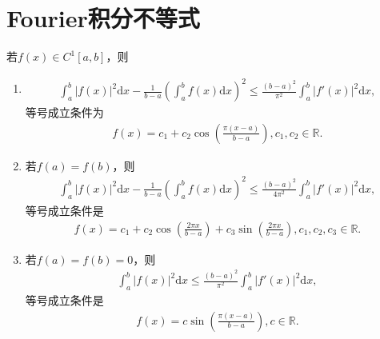 \documentclass[../../main.tex]{subfiles}
\begin{document}
\section{Fourier积分不等式}

\begin{theorem}[Fourier积分不等式]\label{theorem:Fourier积分不等式}
若$f(x)\in C^1[a,b]$，则
\begin{enumerate}[(1)]
\item \begin{align*}
\int_{a}^{b} |f(x)|^2 \mathrm{d}x - \frac{1}{b - a} \left( \int_{a}^{b} f(x) \mathrm{d}x \right)^2 \leq \frac{(b - a)^2}{\pi^2} \int_{a}^{b} |f'(x)|^2 \mathrm{d}x,
\end{align*}
等号成立条件为
\begin{align*}
f(x) = c_1 + c_2 \cos\left( \frac{\pi(x - a)}{b - a} \right), c_1, c_2 \in \mathbb{R}.
\end{align*}

\item 若$f(a) = f(b)$，则
\begin{align*}
\int_{a}^{b} |f(x)|^2 \mathrm{d}x - \frac{1}{b - a} \left( \int_{a}^{b} f(x) \mathrm{d}x \right)^2 \leq \frac{(b - a)^2}{4\pi^2} \int_{a}^{b} |f'(x)|^2 \mathrm{d}x,
\end{align*}
等号成立条件是
\begin{align*}
f(x) = c_1 + c_2 \cos\left( \frac{2\pi x}{b - a} \right) + c_3 \sin\left( \frac{2\pi x}{b - a} \right), c_1, c_2, c_3 \in \mathbb{R}.
\end{align*}

\item 若$f(a) = f(b) = 0$，则
\begin{align*}
\int_{a}^{b} |f(x)|^2 \mathrm{d}x \leq \frac{(b - a)^2}{\pi^2} \int_{a}^{b} |f'(x)|^2 \mathrm{d}x,
\end{align*}
等号成立条件是
\begin{align*}
f(x) = c \sin\left( \frac{\pi (x - a)}{b - a} \right), c \in \mathbb{R}.
\end{align*} 
\end{enumerate}
\end{theorem}
\end{document}
